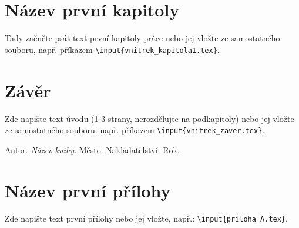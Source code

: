 \documentclass[a4paper,twoside,12pt]{book}
\newcommand{\ti}{\textit} %
\begin{document}
\chapter{Název první kapitoly}
%
Tady začněte psát text první kapitoly práce nebo jej vložte ze samostatného souboru, např. příkazem \texttt{\textbackslash input\{vnitrek\_kapitola1.tex\}}.
%


\chapter*{Závěr} %
%
Zde napište text úvodu (1-3 strany, nerozdělujte na podkapitoly) nebo jej vložte ze samostatného souboru: např. příkazem \texttt{\textbackslash input\{vnitrek\_zaver.tex\}}.
%
%


\clearpage  %

\begin{thebibliography}{99}   
	 Autor. \ti{Název knihy}. Město. Nakladatelství. Rok.  
\end{thebibliography}


\newpage %
\appendix %



\chapter{Název první přílohy}
%
Zde napište text první přílohy nebo jej vložte, např.: \texttt{\textbackslash input\{priloha\_A.tex\}}.
%
\end{document}
